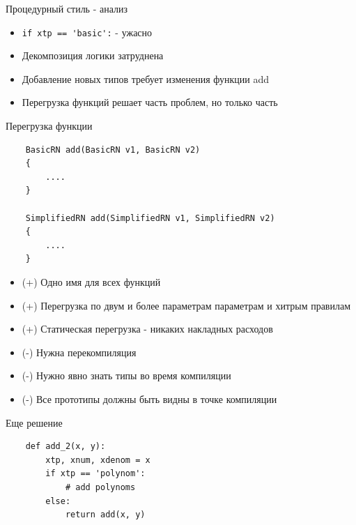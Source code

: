 \documentclass{article}
\begin{document}
\begin{center} Процедурный стиль - анализ \end{center}
\begin{itemize}
    \item \lstinline!if xtp == 'basic':! - ужасно
    \item Декомпозиция логики затруднена
    \item Добавление новых типов требует изменения функции add
    \item Перегрузка функций решает часть проблем, но только часть
\end{itemize}
\newpage
\begin{center} Перегрузка функции \end{center}
\lstset{language=C++}
\begin{lstlisting}
    BasicRN add(BasicRN v1, BasicRN v2)
    {
        ....
    }

    SimplifiedRN add(SimplifiedRN v1, SimplifiedRN v2)
    {
        ....
    }
\end{lstlisting}
\lstset{language=python}
\newpage

\begin{itemize}
    \item (+) Одно имя для всех функций
    \item (+) Перегрузка по двум и более параметрам параметрам и хитрым правилам
    \item (+) Статическая перегрузка - никаких накладных расходов
    \item (-) Нужна перекомпиляция
    \item (-) Нужно явно знать типы во время компиляции
    \item (-) Все прототипы должны быть видны в точке компиляции
\end{itemize}
\newpage

\begin{center} Еще решение \end{center} 
\begin{lstlisting}
    def add_2(x, y):
        xtp, xnum, xdenom = x
        if xtp == 'polynom':
            # add polynoms
        else:
            return add(x, y)
\end{lstlisting}
\newpage
\end{document}
